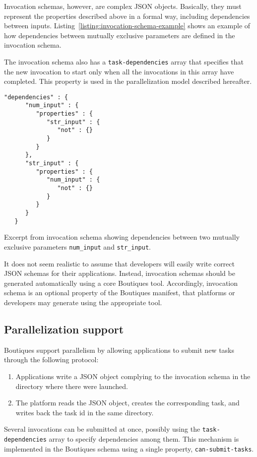 \documentclass{article}
\begin{document}
Invocation schemas, however, are complex JSON objects. Basically, they
must represent the properties described above in a formal way,
including dependencies between
inputs. Listing~\ref{listing:invocation-schema-example} shows an
example of how dependencies between mutually exclusive parameters are
defined in the invocation schema.

The invocation schema also has a \texttt{task-dependencies} array that
specifies that the new invocation to start only when all the
invocations in this array have completed. This property is used in the
parallelization model described hereafter.

\begin{listing}
\begin{verbatim}
"dependencies" : {
      "num_input" : {
         "properties" : {
            "str_input" : {
               "not" : {}
            }
         }
      },
      "str_input" : {
         "properties" : {
            "num_input" : {
               "not" : {}
            }
         }
      }
   }
\end{verbatim}
\caption{Excerpt from invocation schema showing dependencies between
  two mutually exclusive parameters \texttt{num\_input} and
  \texttt{str\_input}.}
\label{listing:invocation-schema-example}
\end{listing}


It does not seem realistic to assume that developers will easily write
correct JSON schemas for their applications. Instead, invocation
schemas should be generated automatically using a core Boutiques
tool. Accordingly, invocation schema is an optional property of the
Boutiques manifest, that platforms or developers may generate using
the appropriate tool.

\subsection{Parallelization support}
\label{sec:parallelization}
Boutiques support parallelism by allowing applications to submit new
tasks through the following protocol:
\begin{enumerate}
\item Applications write a JSON object complying to the invocation
  schema in the directory where there were launched.
\item The platform reads the JSON object, creates the corresponding
  task, and writes back the task id in the same directory.
\end{enumerate}
Several invocations can be submitted at once, possibly using the
\texttt{task-dependencies} array to specify dependencies among
them. This mechanism is implemented in the Boutiques schema using a
single property, \texttt{can-submit-tasks}.
\end{document}
